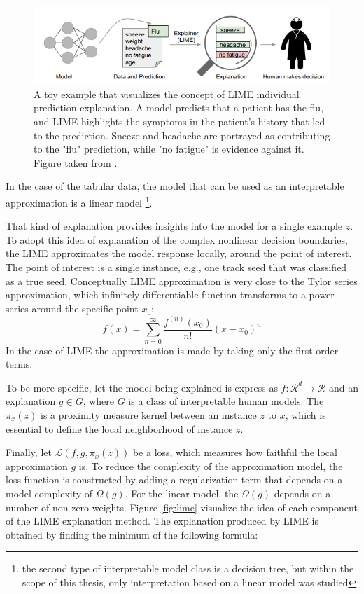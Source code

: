\begin{figure}[h]
\centering
\includegraphics{figures/lime_doctor.PNG}
\caption{A toy example that visualizes the concept of LIME individual prediction explanation. A model predicts that a patient has the flu, and LIME highlights the symptoms in the patient's history that led to the prediction. Sneeze and headache are portrayed as contributing to the "flu" prediction, while "no fatigue" is evidence against it. Figure taken from \cite{lime}.
\label{fig:LIME_doctor}}
\end{figure} 


In the case of the tabular data, the model that can be used as an interpretable approximation is a linear model \footnote{the second type of interpretable model class is a decision tree, but within the scope of this thesis, only interpretation based on a linear model was studied}. 

   That kind of explanation provides insights into the model for a single example $z$. To adopt this idea of explanation of the complex nonlinear decision boundaries, the LIME approximates the model response locally, around the point of interest. The point of interest is a single instance, e.g., one track seed that was classified as a true seed.  
Conceptually LIME approximation is very close to the Tylor series approximation, which infinitely differentiable function transforms to a power series around the specific point $x_0$: 
\begin{equation}
    f(x) = \sum_{n=0}^{\infty} \frac{f^{(n)}(x_0)}{n!} (x-x_0)^n
\end{equation}
In the case of LIME the approximation is made by taking only the first order terms.  
 
To be more specific, let the model being explained is express as $f: \mathcal{R}^{d}\rightarrow  \mathcal{R} $ and an explanation $g \in G$, where $G$ is a class of interpretable human models. The $\pi_x(z)$ is a proximity measure kernel between an instance $z$ to $x$, which is essential to define the local neighborhood of instance $z$.

Finally, let $\mathcal{L}(f,g,\pi_x(z))$ be a loss, which measures how faithful the local approximation $g$ is. 
To reduce the complexity of the approximation model, the loss function is constructed by adding a regularization term that depends on a model complexity of $\Omega(g)$. For the linear model, the $\Omega(g)$ depends on a number of non-zero weights. Figure \ref{fig:lime} visualize the idea of each component of the LIME explanation method. 
The explanation produced by LIME is obtained by finding the minimum of the following formula: 

